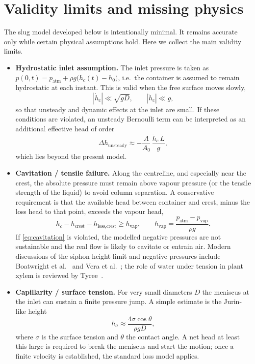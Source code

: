 \documentclass[11pt]{article}
\begin{document}
\section{Validity limits and missing physics}
\label{sec:limits}
The slug model developed below is intentionally minimal. It remains accurate only while
certain physical assumptions hold. Here we collect the main validity limits.
\begin{itemize}
  \item \textbf{Hydrostatic inlet assumption.} The inlet pressure is taken as
    $p(0,t)=p_{\mathrm{atm}}+\rho g\bigl(h_c(t)-h_0\bigr)$, i.e.\ the container is assumed to
    remain hydrostatic at each instant. This is valid when the free surface moves slowly,
    \[
      |\dot h_c|\ll \sqrt{gD},\qquad |\ddot h_c|\ll g,
    \]
    so that unsteady and dynamic effects at the inlet are small. If these conditions are
    violated, an unsteady Bernoulli term can be interpreted as an additional effective head
    of order
    \[
      \Delta h_{\text{unsteady}}\approx -\frac{A}{A_0}\,\frac{\dot h_c\,\dot L}{g},
    \]
    which lies beyond the present model.

  \item \textbf{Cavitation / tensile failure.} Along the centreline, and especially near the
    crest, the absolute pressure must remain above vapour pressure (or the tensile strength
    of the liquid) to avoid column separation. A conservative requirement is that the
    available head between container and crest, minus the loss head to that point, exceeds
    the vapour head,
    \begin{equation}
      h_c - h_{\text{crest}} - h_{\text{loss,crest}} \ge h_{\mathrm{vap}},\qquad
      h_{\mathrm{vap}} = \frac{p_{\mathrm{atm}}-p_{\mathrm{vap}}}{\rho g}.
      \label{eq:cavitation}
    \end{equation}
    If \eqref{eq:cavitation} is violated, the modelled negative pressures are not sustainable
    and the real flow is likely to cavitate or entrain air. Modern discussions of the siphon
    height limit and negative pressures include Boatwright et al.~\cite{boatwright} and
    Vera et al.~\cite{vera}; the role of water under tension in plant xylem is reviewed by
    Tyree~\cite{tyree}.

  \item \textbf{Capillarity / surface tension.} For very small diameters $D$ the meniscus
    at the inlet can sustain a finite pressure jump. A simple estimate is the Jurin-like
    height
    \[
      h_{\sigma}\approx \frac{4\sigma\cos\theta}{\rho g D},
    \]
    where $\sigma$ is the surface tension and $\theta$ the contact angle. A net head
    at least this large is required to break the meniscus and start the motion; once a finite
    velocity is established, the standard loss model applies.


\end{itemize}
\end{document}

